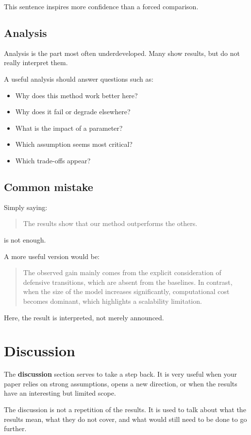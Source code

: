 \documentclass[11pt,a4paper]{article}
\theoremstyle{definition}
\begin{document}
This sentence inspires more confidence than a forced comparison.

\subsection*{Analysis}

Analysis is the part most often underdeveloped. Many show results, but do not really interpret them.

A useful analysis should answer questions such as:
\begin{itemize}
    \item Why does this method work better here?
    \item Why does it fail or degrade elsewhere?
    \item What is the impact of a parameter?
    \item Which assumption seems most critical?
    \item Which trade-offs appear?
\end{itemize}

\subsection*{Common mistake}

Simply saying:
\begin{quote}
The results show that our method outperforms the others.
\end{quote}
is not enough.

A more useful version would be:
\begin{quote}
The observed gain mainly comes from the explicit consideration of defensive transitions, which are absent from the baselines. In contrast, when the size of the model increases significantly, computational cost becomes dominant, which highlights a scalability limitation.
\end{quote}

Here, the result is interpreted, not merely announced.

\section{Discussion}

The \textbf{discussion} section serves to take a step back. It is very useful when your paper relies on strong assumptions, opens a new direction, or when the results have an interesting but limited scope.

The discussion is not a repetition of the results. It is used to talk about what the results mean, what they do not cover, and what would still need to be done to go further.
\end{document}
